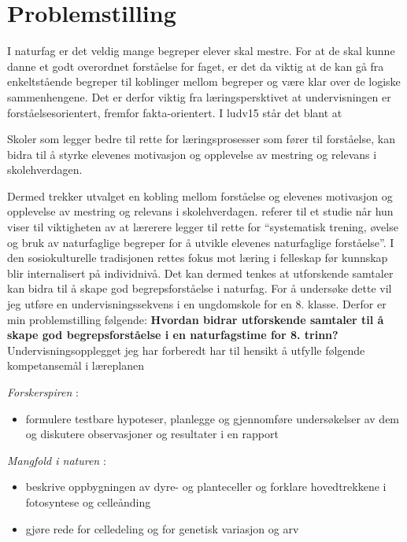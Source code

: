 \documentclass[main.tex]{subfiles}
\begin{document}
\section*{Problemstilling}

I naturfag er det veldig mange begreper elever skal mestre. For at de skal kunne danne et godt 
overordnet forståelse for faget, er det da viktig at de kan gå fra enkeltstående begreper til 
koblinger mellom begreper og være klar over de logiske sammenhengene. Det er derfor viktig fra 
læringspersktivet at undervisningen er forståelsesorientert, fremfor fakta-orientert. I \citeA
{ludv15} står det blant at
\begin{displayquote}
Skoler som legger bedre til rette for læringsprosesser som fører til forståelse, kan bidra til å 
styrke elevenes motivasjon og opplevelse av mestring og relevans i skolehverdagen. 
\end{displayquote}
Dermed trekker utvalget en kobling mellom forståelse og elevenes motivasjon og opplevelse av
mestring og relevans i skolehverdagen.  referer til et studie når hun viser 
til viktigheten av at lærerere legger til rette for ``systematisk trening, øvelse og bruk av 
naturfaglige begreper for å utvikle elevenes naturfaglige forståelse''. I den sosiokulturelle 
tradisjonen rettes fokus mot læring i felleskap før kunnskap blir internalisert på individnivå. 
Det kan dermed tenkes at utforskende samtaler kan bidra til å skape god begrepsforståelse i 
naturfag. For å undersøke dette vil jeg utføre en undervisningssekvens i en ungdomskole for
en 8. klasse.
\newline
\newline
Derfor er min problemstilling følgende:
\newline
\newline
\textbf{Hvordan bidrar utforskende samtaler til å skape god begrepsforståelse i en naturfagstime 
for 8. trinn?}
\newline
\newline
Undervisningsopplegget jeg har forberedt har til hensikt å utfylle følgende kompetansemål i 
læreplanen
\begin{displayquote}
\emph{Forskerspiren} :
\begin{itemize}
\vspace{-2mm}
\item formulere testbare hypoteser, planlegge og gjennomføre undersøkelser 
av dem og diskutere observasjoner og resultater i en rapport
\end{itemize}
\emph{Mangfold i naturen} :
\begin{itemize}
\vspace{-2mm}
\item beskrive oppbygningen av dyre- og planteceller og forklare hovedtrekkene i fotosyntese 
og celleånding
\vspace{-2mm}
\item gjøre rede for celledeling og for genetisk variasjon og arv
\end{itemize}
\end{displayquote} 
\end{document}
